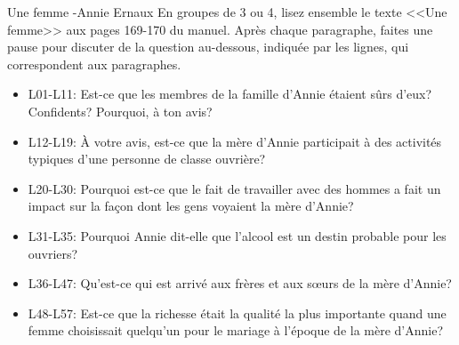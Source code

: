 \begin{frame}{Une femme -Annie Ernaux}
  \footnotesize
  En groupes de 3 ou 4, lisez ensemble le texte <<Une femme>> aux pages 169-170 du manuel.
  Après chaque paragraphe, faites une pause pour discuter de la question au-dessous, indiquée par les lignes, qui correspondent aux paragraphes.
  \begin{itemize}
    \item[] L01-L11: Est-ce que les membres de la famille d'Annie étaient sûrs d'eux? Confidents? Pourquoi, à ton avis?
    \item[] L12-L19: À votre avis, est-ce que la mère d'Annie participait à des activités typiques d'une personne de classe ouvrière?
    \item[] L20-L30: Pourquoi est-ce que le fait de travailler avec des hommes a fait un impact sur la façon dont les gens voyaient la mère d'Annie?
    \item[] L31-L35: Pourquoi Annie dit-elle que l'alcool est un destin probable pour les ouvriers?
    \item[] L36-L47: Qu'est-ce qui est arrivé aux frères et aux sœurs de la mère d'Annie?
    \item[] L48-L57: Est-ce que la richesse était la qualité la plus importante quand une femme choisissait quelqu'un pour le mariage à l'époque de la mère d'Annie?
  \end{itemize}
\end{frame}